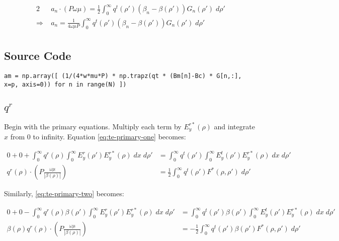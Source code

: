 \documentclass[11pt, oneside]{article}   	%
\begin{document}
\begin{align}
2 &a_{n} \cdot \left( P \omega \mu \right) = \frac{1}{2} \int_{0}^{\infty} q^{t} (\rho ') (\beta_{n} - \beta(\rho ')) G_{n} (\rho ') \; d\rho' \nonumber \\
\Rightarrow \; &a_{n} = \frac{1}{4 \omega \mu P} \int_{0}^{\infty} q^{t} (\rho ') (\beta_{n} - \beta(\rho ')) G_{n} (\rho ') \; d\rho' \\
\end{align}

\subsection{Source Code}

\begin{lstlisting}
am = np.array([ (1/(4*w*mu*P) * np.trapz(qt * (Bm[n]-Bc) * G[n,:], x=p, axis=0)) for n in range(N) ])
\end{lstlisting}



\subsection{$q^{r}$}

Begin with the primary equations. Multiply each term by $E_{y}^{r*}(\rho)$ and integrate $x$ from 0 to infinity. Equation \eqref{eq:te-primary-one} becomes:

\begin{align*}
0 + 0 + \int_{0}^{\infty} q^{r}(\rho) \int_{0}^{\infty} E_{y}^{r} (\rho ') E_{y}^{r*} (\rho) \; dx \; d\rho ' &= \int_{0}^{\infty} q^{t} (\rho ') \int_{0}^{\infty} E_{y}^{t}(\rho ') E_{y}^{r*}(\rho) \; dx \; d\rho ' \\
q^{r}(\rho) \cdot \left( P \frac{\omega \mu}{|\beta (\rho)|} \right) &= \frac{1}{2} \int_{0}^{\infty} q^{t} (\rho ') F^{*}(\rho, \rho') \; d\rho'
\end{align*}

\noindent Similarly, \eqref{eq:te-primary-two} becomes:

\begin{align*}
0 + 0 - \int_{0}^{\infty} q^{r}(\rho) \beta(\rho ') \int_{0}^{\infty} E_{y}^{r} (\rho ') E_{y}^{r*} (\rho) \; dx \; d\rho ' &= \int_{0}^{\infty} q^{t} (\rho ') \beta (\rho ') \int_{0}^{\infty} E_{y}^{t}(\rho ') E_{y}^{r*}(\rho) \; dx \; d\rho ' \\
\beta(\rho) q^{r}(\rho) \cdot \left( P \frac{\omega \mu}{|\beta (\rho)|} \right) &= -\frac{1}{2} \int_{0}^{\infty} q^{t} (\rho ') \beta (\rho ') F^{*}(\rho, \rho') \; d\rho'
\end{align*}
\end{document}
